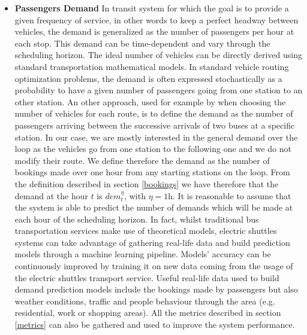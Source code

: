 \documentclass[12pt,a4paper]{article}
\begin{document}
\begin{itemize}
\setlength\itemsep{1pt}
\item \textbf{Passengers Demand} In transit system for which the goal is to provide a given frequency of service, in other words to keep a perfect headway between vehicles, the demand is generalized as the number of passengers per hour at each stop. This demand can be time-dependent and vary through the scheduling horizon. The ideal number of vehicles can be directly derived using standard transportation mathematical models. In standard vehicle routing optimization problems, the demand is often expressed stochastically as a probability to have a given number of passengers going from one station to an other station. An other approach, used for example by \cite{ga} when choosing the number of vehicles for each route, is to define the demand as the number of passengers arriving between the successive arrivals of two buses at a specific station. In our case, we are mostly interested in the general demand over the loop as the vehicles go from one station to the following one and we do not modify their route. We define therefore the demand as the number of bookings made over one hour from any starting stations on the loop. From the definition described in section \ref{bookings} we have therefore that the demand at the hour $t$ is $dem_{t}^{\eta}$, with $\eta = 1$h. It is reasonable to assume that the system is able to predict the number of demands which will be made at each hour of the scheduling horizon. In fact, whilst traditional bus transportation services make use of theoretical models, electric shuttles systems can take advantage of gathering real-life data and build prediction models through a machine learning pipeline. Models' accuracy can be continuously improved by training it on new data coming from the usage of the electric shuttles transport service. Useful real-life data used to build demand prediction models include the bookings made by passengers but also weather conditions, traffic and people behaviour through the area (e.g. residential, work or shopping areas). All the metrics described in section \ref{metrics} can also be gathered and used to improve the system performance.

\end{itemize}
\end{document}
